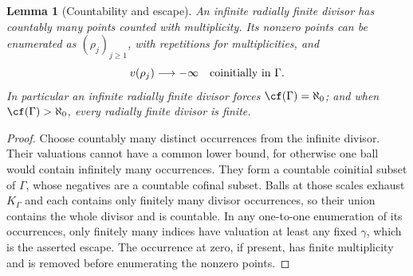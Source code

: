 \documentclass[11pt]{article}
\theoremstyle{plain}
\newtheorem{lemma}[lemma]{Lemma}
\theoremstyle{plain}
\theoremstyle{plain}
\theoremstyle{definition}
\theoremstyle{definition}
\theoremstyle{definition}
\theoremstyle{definition}
\theoremstyle{remark}
\newcommand{\K}{K_\Gamma}\newcommand{\KD}{K_\Delta}
\begin{document}
\begin{lemma}[Countability and escape]\label{ent:lem:divisor-countable}
An infinite radially finite divisor has countably many points counted with
multiplicity. Its nonzero points can be enumerated as $(\rho_j)_{j\ge1}$,
with repetitions for multiplicities, and
\[
 v(\rho_j)\longrightarrow-\infty \quad\hbox{coinitially in }\Gamma.
\]
In particular an infinite radially finite divisor forces
$\cf(\Gamma)=\aleph_0$; and when $\cf(\Gamma)>\aleph_0$, every radially
finite divisor is finite.
\end{lemma}
\begin{proof}
Choose countably many distinct occurrences from the infinite divisor. Their
valuations cannot have a common lower bound, for otherwise one ball would
contain infinitely many occurrences. They form a countable coinitial subset
of $\Gamma$, whose negatives are a countable cofinal subset. Balls at those
scales exhaust $\K$ and each contains only finitely many divisor
occurrences, so their union contains the whole divisor and is countable. In
any one-to-one enumeration of its occurrences, only finitely many indices
have valuation at least any fixed $\gamma$, which is the asserted escape. The
occurrence at zero, if present, has finite multiplicity and is removed before
enumerating the nonzero points.
\end{proof}
\end{document}
